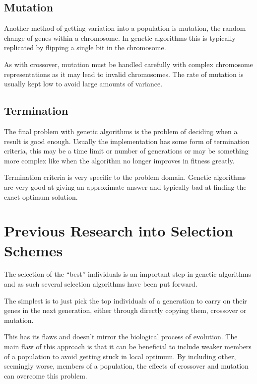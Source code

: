 \documentclass[10pt, a4paper]{article}
\begin{document}
\subsection{Mutation}

Another method of getting variation into a population is mutation, the random
change of genes within a chromosome. In genetic algorithms this is typically
replicated by flipping a single bit in the chromosome.

As with crossover, mutation must be handled carefully with complex chromosome
representations as it may lead to invalid chromosomes. The rate of mutation 
is usually kept low to avoid large amounts of variance.


\subsection{Termination}

The final problem with genetic algorithms is the problem of deciding when a 
result is good enough. Usually the implementation has some form of termination
criteria, this may be a time limit or number of generations or may be something
more complex like when the algorithm no longer improves in fitness greatly.

Termination criteria is very specific to the problem domain. Genetic algorithms
are very good at giving an approximate answer and typically bad at finding the
exact optimum solution.

\FloatBarrier

\newpage
\section{Previous Research into Selection Schemes}
\label{sec:selection-algorithms}

The selection of the ``best'' individuals is an important step in genetic
algorithms and as such several selection algorithms have been put forward.

The simplest is to just pick the top individuals of a generation to carry on
their genes in the next generation, either through directly copying them, 
crossover or mutation.

This has its flaws and doesn't mirror the biological process of evolution. The
main flaw of this approach is that it can be beneficial to include weaker 
members of a population to avoid getting stuck in local optimum. By including
other, seemingly worse, members of a population, the effects of crossover and
mutation can overcome this problem.
\end{document}
